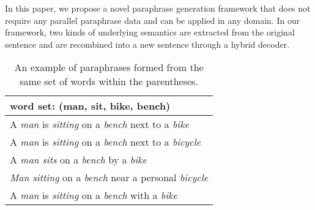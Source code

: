 
In this paper, we propose a novel paraphrase generation framework that does not require any parallel paraphrase data and can be applied in any domain. 
In our framework, two kinds of underlying semantics are extracted from 
the original sentence and are recombined into a new sentence through 
a hybrid decoder.

\begin{table}[th]
\small
\centering
\begin{tabular}{l}
\hline 
word set: \textbf{(man, sit, bike, bench)} \\
\hline
A \textit{\color{red}man} is \textit{\color{red}sitting} on a \textit{\color{red}bench} next to a \textit{\color{red}bike} \\
A \textit{\color{red}man} is \textit{\color{red}sitting} on a \textit{\color{red}bench} next to a \textit{\color{red}bicycle} \\
A \textit{\color{red}man sits} on a \textit{\color{red}bench} by a \textit{\color{red}bike} \\
\textit{\color{red}Man sitting} on a \textit{\color{red}bench} near a personal \textit{\color{red}bicycle} \\
A \textit{\color{red}man} is \textit{\color{red}sitting} on a \textit{\color{red}bench} with a \textit{\color{red}bike} \\
\hline
\end{tabular}
\caption{\label{para-example} An example of paraphrases formed
from the same set of words within the parentheses.} 
\end{table}

